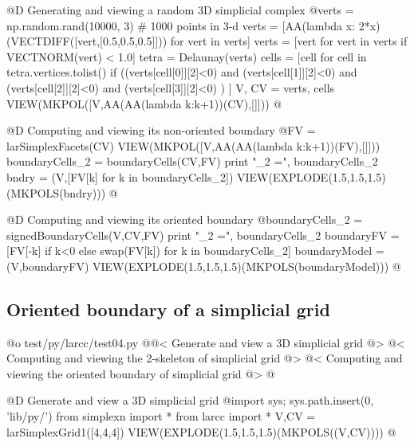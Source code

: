 \documentclass[11pt,oneside]{article}	%
\begin{document}
@D Generating and viewing a random 3D simplicial complex
@{verts = np.random.rand(10000, 3) # 1000 points in 3-d
verts = [AA(lambda x: 2*x)(VECTDIFF([vert,[0.5,0.5,0.5]])) for vert in verts]
verts = [vert for vert in verts if VECTNORM(vert) < 1.0]
tetra = Delaunay(verts)
cells = [cell for cell in tetra.vertices.tolist()
		 if  ((verts[cell[0]][2]<0) and (verts[cell[1]][2]<0) 
		 		and (verts[cell[2]][2]<0) and (verts[cell[3]][2]<0) ) ]
V, CV = verts, cells
VIEW(MKPOL([V,AA(AA(lambda k:k+1))(CV),[]]))
@}

@D Computing and viewing its non-oriented boundary 
@{FV = larSimplexFacets(CV)
VIEW(MKPOL([V,AA(AA(lambda k:k+1))(FV),[]]))
boundaryCells_2 = boundaryCells(CV,FV)
print "\nboundaryCells_2 =\n", boundaryCells_2
bndry = (V,[FV[k] for k in boundaryCells_2])
VIEW(EXPLODE(1.5,1.5,1.5)(MKPOLS(bndry)))
@}

@D Computing and viewing its oriented boundary
@{boundaryCells_2 = signedBoundaryCells(V,CV,FV)
print "\nboundaryCells_2 =\n", boundaryCells_2
boundaryFV = [FV[-k] if k<0 else swap(FV[k]) for k in boundaryCells_2]
boundaryModel = (V,boundaryFV)
VIEW(EXPLODE(1.5,1.5,1.5)(MKPOLS(boundaryModel)))
@}

\subsection{Oriented boundary of a simplicial grid}

@o test/py/larcc/test04.py
@{@< Generate and view a 3D simplicial grid @>
@< Computing and viewing the 2-skeleton of simplicial grid @>
@< Computing and viewing the oriented boundary of simplicial grid @>
@}


@D Generate and view a 3D simplicial grid
@{import sys; sys.path.insert(0, 'lib/py/')
from simplexn import *
from larcc import *
V,CV = larSimplexGrid1([4,4,4])
VIEW(EXPLODE(1.5,1.5,1.5)(MKPOLS((V,CV))))
@}
\end{document}
